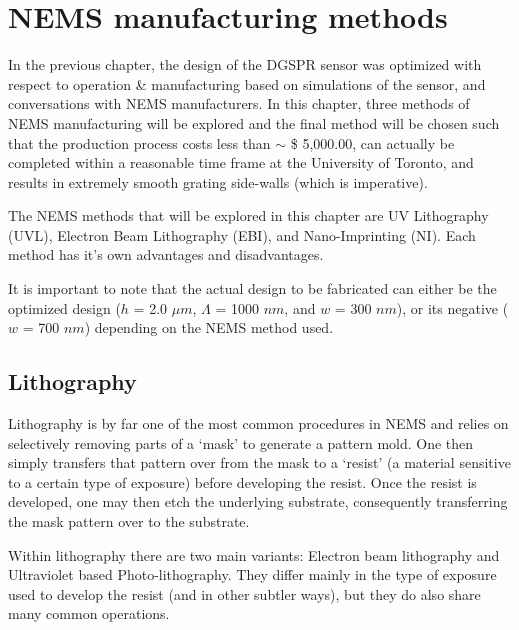 

\chapter{NEMS manufacturing methods}

In the previous chapter, the design of the DGSPR sensor was optimized with respect to operation \& manufacturing based on simulations of the sensor, and conversations with NEMS manufacturers. In this chapter, three methods of NEMS manufacturing will be explored and the final method will be chosen such that the production process costs less than $\sim$ \$ 5,000.00, can actually be completed within a reasonable time frame at the University of Toronto, and results in extremely smooth grating side-walls (which is imperative). 

The NEMS methods that will be explored in this chapter are UV Lithography (UVL), Electron Beam Lithography (EBI), and Nano-Imprinting (NI). Each method has it's own advantages and disadvantages. 

It is important to note that the actual design to be fabricated can either be the optimized design ($h$ = 2.0 $\mu m$, $\Lambda$ = 1000 $nm$, and $w$ = 300 $nm$), or its negative ($w$ = 700 $nm$) depending on the NEMS method used. 

\section{Lithography}

Lithography is by far one of the most common procedures in NEMS and relies on selectively removing parts of a `mask' to generate a pattern mold. One then simply transfers that pattern over from the mask to a `resist' (a material sensitive to a certain type of exposure) before developing the resist. Once the resist is developed, one may then etch the underlying substrate, consequently transferring the mask pattern over to the substrate. 

Within lithography there are two main variants: Electron beam lithography and Ultraviolet based Photo-lithography. They differ mainly in the type of exposure used to develop the resist (and in other subtler ways), but they do also share many common operations. 

